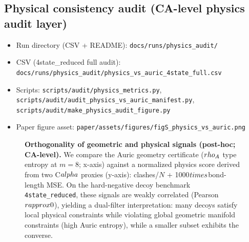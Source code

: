 \subsection*{Physical consistency audit (CA-level physics audit layer)}
\begin{itemize}
  \item Run directory (CSV + README): \texttt{docs/runs/physics\_audit/}
  \item CSV (4state\_reduced full audit): \texttt{docs/runs/physics\_audit/physics\_vs\_auric\_4state\_full.csv}
  \item Scripts: \texttt{scripts/audit/physics\_metrics.py}, \texttt{scripts/audit/audit\_physics\_vs\_auric\_manifest.py}, \texttt{scripts/audit/make\_physics\_audit\_figure.py}
  \item Paper figure asset: \texttt{paper/assets/figures/figS\_physics\_vs\_auric.png}
\end{itemize}

\begin{figure}[t]
  \centering
  \caption{\textbf{Orthogonality of geometric and physical signals (post-hoc; CA-level).} We compare the Auric geometry certificate ($\\rho_A$ type entropy at $m=8$; x-axis) against a normalized physics score derived from two C$\\alpha$ proxies (y-axis): clashes/$N$ + 1000$\\times$bond-length MSE. On the hard-negative decoy benchmark \texttt{4state\_reduced}, these signals are weakly correlated (Pearson $r\\approx 0$), yielding a dual-filter interpretation: many decoys satisfy local physical constraints while violating global geometric manifold constraints (high Auric entropy), while a smaller subset exhibits the converse.}
  \label{fig:physics_audit}
\end{figure}

